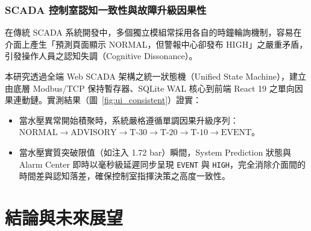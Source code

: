 \documentclass[fontset=none, a4paper, 12pt]{ctexart}
\begin{document}
\begin{doublespace}
\subsubsection{SCADA 控制室認知一致性與故障升級因果性}
在傳統 SCADA 系統開發中，多個獨立模組常採用各自的時鐘輪詢機制，容易在介面上產生「預測頁面顯示 NORMAL，但警報中心卻發布 HIGH」之嚴重矛盾，引發操作人員之認知失調（Cognitive Dissonance）。

本研究透過全端 Web SCADA 架構之統一狀態機（Unified State Machine），建立由底層 Modbus/TCP 保持暫存器、SQLite WAL 核心到前端 React 19 之單向因果連動鏈。實測結果（圖~\ref{fig:ui_consistent}）證實：
\begin{itemize}
    \item 當水壓異常開始積聚時，系統嚴格遵循單調因果升級序列：$\text{NORMAL} \to \text{ADVISORY} \to \text{T-30} \to \text{T-20} \to \text{T-10} \to \text{EVENT}$。
    \item 當水壓實質突破限值（如注入 1.72 bar）瞬間，System Prediction 狀態與 Alarm Center 即時以毫秒級延遲同步呈現 \texttt{EVENT} 與 \texttt{HIGH}，完全消除介面間的時間差與認知落差，確保控制室指揮決策之高度一致性。
\end{itemize}

\clearpage
\section{結論與未來展望}


\end{doublespace}
\end{document}
